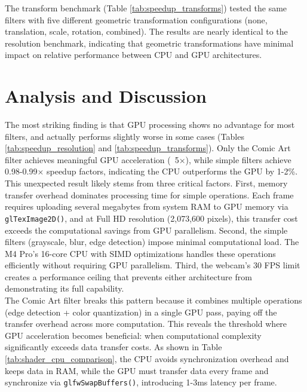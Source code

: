 \documentclass[12pt,a4paper]{article}
\begin{document}
The transform benchmark (Table \ref{tab:speedup_transforms}) tested the same filters with five different geometric transformation configurations (none, translation, scale, rotation, combined). The results are nearly identical to the resolution benchmark, indicating that geometric transformations have minimal impact on relative performance between CPU and GPU architectures.

\section{Analysis and Discussion}
The most striking finding is that GPU processing shows no advantage for most filters, and actually performs slightly worse in some cases (Tables \ref{tab:speedup_resolution} and \ref{tab:speedup_transforms}). Only the Comic Art filter achieves meaningful GPU acceleration (~5×), while simple filters achieve 0.98-0.99× speedup factors, indicating the CPU outperforms the GPU by 1-2\%.
\\
This unexpected result likely stems from three critical factors. First, memory transfer overhead dominates processing time for simple operations. Each frame requires uploading several megabytes from system RAM to GPU memory via \texttt{glTexImage2D()}, and at Full HD resolution (2,073,600 pixels), this transfer cost exceeds the computational savings from GPU parallelism. Second, the simple filters (grayscale, blur, edge detection) impose minimal computational load. The M4 Pro's 16-core CPU with SIMD optimizations handles these operations efficiently without requiring GPU parallelism. Third, the webcam's 30 FPS limit creates a performance ceiling that prevents either architecture from demonstrating its full capability.
\\
The Comic Art filter breaks this pattern because it combines multiple operations (edge detection + color quantization) in a single GPU pass, paying off the transfer overhead across more computation. This reveals the threshold where GPU acceleration becomes beneficial: when computational complexity significantly exceeds data transfer costs. As shown in Table \ref{tab:shader_cpu_comparison}, the CPU avoids synchronization overhead and keeps data in RAM, while the GPU must transfer data every frame and synchronize via \texttt{glfwSwapBuffers()}, introducing 1-3ms latency per frame.
\end{document}
